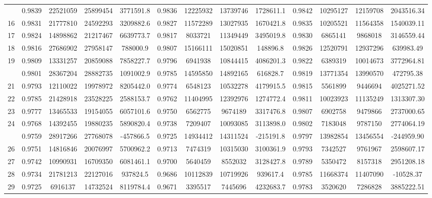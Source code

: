 \documentclass[
  12pt,
]{article}
\begin{document}
\begin{longtable}[t]{lcccccccccccc}
\addlinespace
15 & 0.9839 & 22521059 & 25899454 & 3771591.8 & 0.9836 & 12225932 & 13739746 & 1728611.1 & 0.9842 & 10295127 & 12159708 & 2043516.34\\
16 & 0.9831 & 21777810 & 24592293 & 3209882.6 & 0.9827 & 11572289 & 13027935 & 1670421.8 & 0.9835 & 10205521 & 11564358 & 1540039.11\\
17 & 0.9824 & 14898862 & 21217467 & 6639773.7 & 0.9817 & 8033721 & 11349449 & 3495019.8 & 0.9830 & 6865141 & 9868018 & 3146559.44\\
18 & 0.9816 & 27686902 & 27958147 & 788000.9 & 0.9807 & 15166111 & 15020851 & 148896.8 & 0.9826 & 12520791 & 12937296 & 639983.49\\
19 & 0.9809 & 13331257 & 20859088 & 7858227.7 & 0.9796 & 6941938 & 10844415 & 4086201.3 & 0.9822 & 6389319 & 10014673 & 3772964.81\\
\addlinespace
20 & 0.9801 & 28367204 & 28882735 & 1091002.9 & 0.9785 & 14595850 & 14892165 & 616828.7 & 0.9819 & 13771354 & 13990570 & 472795.38\\
21 & 0.9793 & 12110022 & 19978972 & 8205442.0 & 0.9774 & 6548123 & 10532278 & 4179915.5 & 0.9815 & 5561899 & 9446694 & 4025271.52\\
22 & 0.9785 & 21428918 & 23528225 & 2588153.7 & 0.9762 & 11404995 & 12392976 & 1274772.4 & 0.9811 & 10023923 & 11135249 & 1313307.30\\
23 & 0.9777 & 13465533 & 19154055 & 6057101.6 & 0.9750 & 6562775 & 9674189 & 3317476.8 & 0.9807 & 6902758 & 9479866 & 2737000.65\\
24 & 0.9768 & 14392455 & 19880235 & 5890820.4 & 0.9738 & 7209407 & 10093085 & 3113898.0 & 0.9802 & 7183048 & 9787150 & 2774064.19\\
\addlinespace
25 & 0.9759 & 28917266 & 27768078 & -457866.5 & 0.9725 & 14934412 & 14311524 & -215191.8 & 0.9797 & 13982854 & 13456554 & -244959.90\\
26 & 0.9751 & 14816846 & 20076997 & 5700962.2 & 0.9713 & 7474319 & 10315030 & 3100361.9 & 0.9793 & 7342527 & 9761967 & 2598607.17\\
27 & 0.9742 & 10990931 & 16709350 & 6081461.1 & 0.9700 & 5640459 & 8552032 & 3128427.8 & 0.9789 & 5350472 & 8157318 & 2951208.18\\
28 & 0.9734 & 21781213 & 22127016 & 937824.5 & 0.9686 & 10112839 & 10719926 & 939617.4 & 0.9785 & 11668374 & 11407090 & -10528.37\\
29 & 0.9725 & 6916137 & 14732524 & 8119784.4 & 0.9671 & 3395517 & 7445696 & 4232683.7 & 0.9783 & 3520620 & 7286828 & 3885222.51\\

\end{longtable}
\end{document}
